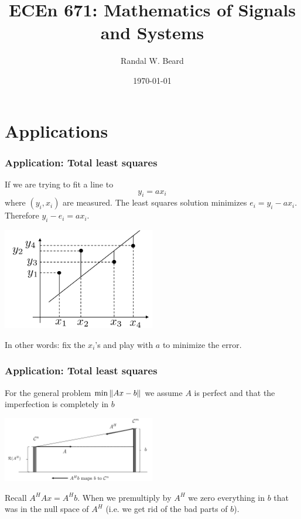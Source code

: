 \documentclass{beamer}
\title{ECEn 671: Mathematics of Signals and Systems}
\author{Randal W. Beard}
\institute{Brigham Young University}
\date{\today}
\begin{document}
\begin{frame}
	\titlepage
\end{frame}



\section{Applications}
\frame{\sectionpage}

\begin{frame}\frametitle{Application:  Total least squares}
	If we are trying to fit a line to
	\[ 
		y_i = ax_i
	\]
	where $(y_i,x_i)$ are measured.  The least squares solution minimizes $e_i = y_i-ax_i$.
	Therefore $y_i - e_i = ax_i$.
	\begin{center}
		\includegraphics[width=0.5\textwidth]
			{figures/chap7_total_least_squares}
	\end{center}
	In other words: fix the $x_i$'s and play with $a$ to minimize the error.	
\end{frame}

\begin{frame}\frametitle{Application:  Total least squares}
	For the general problem $\min \left\|Ax - b\right\|$ we assume $A$ is perfect and that the imperfection is completely in $b$
	\begin{center}
		\includegraphics[width=0.5\textwidth]{figures/chap7_svd_2}
	\end{center}
	Recall $A^HAx = A^Hb$.  When we premultiply by $A^H$ we zero everything in $b$ that was in the null space of $A^H$ (i.e. we get rid of the bad parts of $b$).	
\end{frame}
\end{document}
